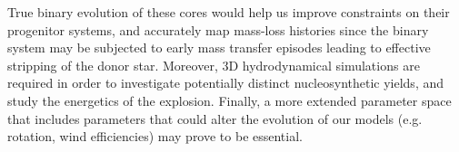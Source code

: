 \documentclass[../../main/thesis_msc.tex]{subfiles}
\begin{document}
True binary evolution of these cores would help us improve constraints on their progenitor systems, and accurately map mass-loss histories since the binary system may be subjected to early mass transfer episodes leading to effective stripping of the donor star. Moreover, 3D hydrodynamical simulations are required in order to investigate potentially distinct nucleosynthetic yields, and study the energetics of the explosion. Finally, a more extended parameter space that includes parameters that could alter the evolution of our models (e.g. rotation, wind efficiencies) may prove to be essential.
\end{document}
